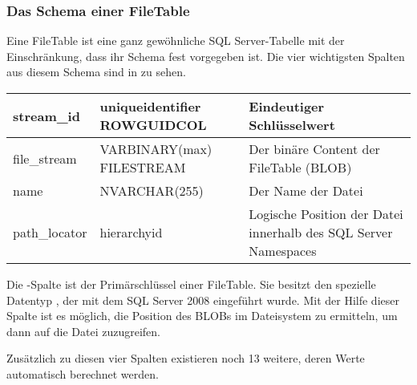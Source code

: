         \subsubsection{Das Schema einer FileTable}
          Eine FileTable ist eine ganz gewöhnliche SQL Server-Tabelle mit der
          Einschränkung, dass ihr Schema fest vorgegeben ist. Die vier
          wichtigsten Spalten aus diesem Schema sind in
           zu sehen.
          \begin{center}
          \label{filetableschema}

            \begin{small}
            \tablehead{
            }
            \tabletail {
              \hline
            }
            \tablelasttail {
              \hline
            }
              \begin{supertabular}{|l|l|p{6.5cm}|}
                stream\_id & uniqueidentifier ROWGUIDCOL & Eindeutiger
                Schlüsselwert \\
                \hline
                file\_stream & VARBINARY(max) FILESTREAM & Der binäre Content
                der FileTable (BLOB) \\
                \hline
                name & NVARCHAR(255) & Der Name der Datei \\
                \hline
                path\_locator & hierarchyid & Logische Position der Datei
                innerhalb des SQL Server Namespaces \\
              \end{supertabular}
            \end{small}
          \end{center}
          Die -Spalte ist der Primärschlüssel einer
          FileTable. Sie besitzt den spezielle Datentyp
          , der mit dem SQL Server 2008 eingeführt
          wurde. Mit der Hilfe dieser Spalte ist es möglich, die Position des
          BLOBs im Dateisystem zu ermitteln, um dann auf die Datei zuzugreifen.
          
          Zusätzlich zu diesen vier Spalten existieren noch 13 weitere, deren
          Werte automatisch berechnet werden.
          \begin{literaturinternet}
            \item \cite{gg492084}
            \item \cite{tallan20120101iafsiad}
          \end{literaturinternet}
